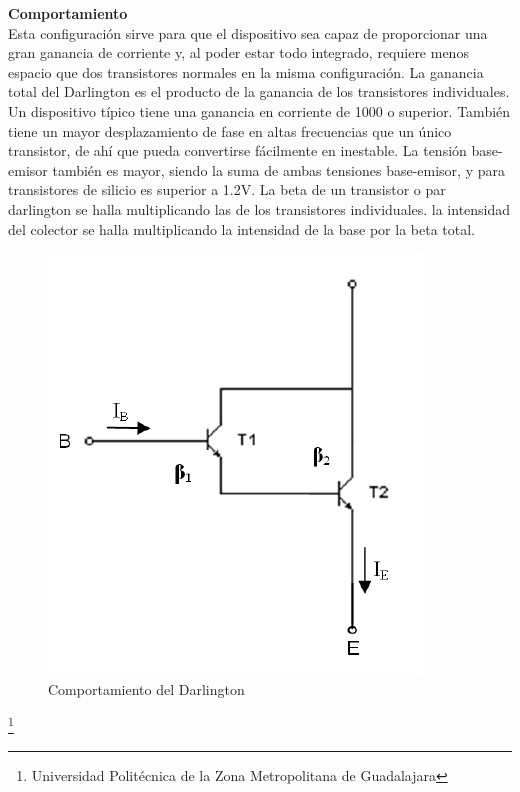 \documentclass[10pt,a4paper]{article}
\begin{document}
\textbf{Comportamiento}\\
Esta configuración sirve para que el dispositivo sea capaz de proporcionar una gran ganancia de corriente y, al poder estar todo integrado, requiere menos espacio que dos transistores normales en la misma configuración. La ganancia total del Darlington es el producto de la ganancia de los transistores individuales.\\
Un dispositivo típico tiene una ganancia en corriente de 1000 o superior. También tiene un mayor desplazamiento de fase en altas frecuencias que un único transistor, de ahí que pueda convertirse fácilmente en inestable. La tensión base-emisor también es mayor, siendo la suma de ambas tensiones base-emisor, y para transistores de silicio es superior a 1.2V. La beta de un transistor o par darlington se halla multiplicando las de los transistores individuales. la intensidad del colector se halla multiplicando la intensidad de la base por la beta total.\\
\begin{figure}[hbtp]
\centering
\includegraphics[scale=0.3]{Pictures/Comportamiento.PNG}
\caption{Comportamiento del Darlington}
\end{figure}

\footnote{Universidad Politécnica de la Zona Metropolitana de Guadalajara}

\newpage
\end{document}
